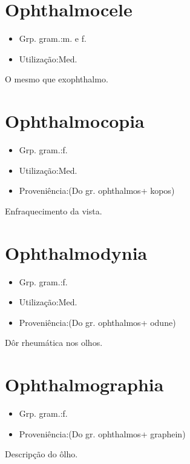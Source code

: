 \section{Ophthalmocele}
\begin{itemize}
\item {Grp. gram.:m.  e  f.}
\end{itemize}
\begin{itemize}
\item {Utilização:Med.}
\end{itemize}
O mesmo que \textunderscore exophthalmo\textunderscore .
\section{Ophthalmocopia}
\begin{itemize}
\item {Grp. gram.:f.}
\end{itemize}
\begin{itemize}
\item {Utilização:Med.}
\end{itemize}
\begin{itemize}
\item {Proveniência:(Do gr. \textunderscore ophthalmos\textunderscore  + \textunderscore kopos\textunderscore )}
\end{itemize}
Enfraquecimento da vista.
\section{Ophthalmodynia}
\begin{itemize}
\item {Grp. gram.:f.}
\end{itemize}
\begin{itemize}
\item {Utilização:Med.}
\end{itemize}
\begin{itemize}
\item {Proveniência:(Do gr. \textunderscore ophthalmos\textunderscore  + \textunderscore odune\textunderscore )}
\end{itemize}
Dôr rheumática nos olhos.
\section{Ophthalmographia}
\begin{itemize}
\item {Grp. gram.:f.}
\end{itemize}
\begin{itemize}
\item {Proveniência:(Do gr. \textunderscore ophthalmos\textunderscore  + \textunderscore graphein\textunderscore )}
\end{itemize}
Descripção do ôlho.
